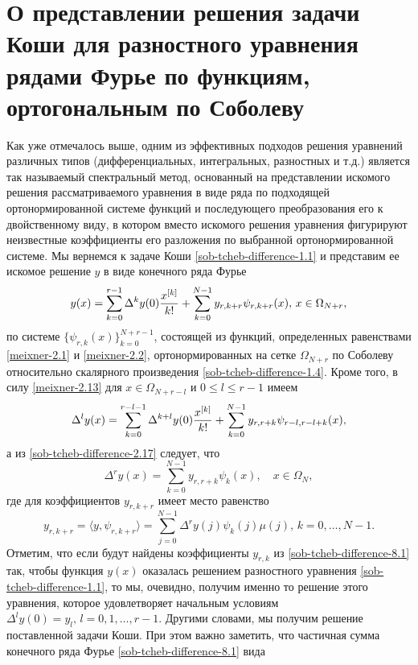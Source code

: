 \section{О представлении решения задачи Коши для разностного уравнения рядами Фурье по функциям, ортогональным по Соболеву}

Как уже отмечалось выше, одним из эффективных подходов решения уравнений различных типов
(дифференциальных, интегральных, разностных и т.д.) является \cite{sob-tcheb-difference-SolDmEg, sob-tcheb-difference-Tref1, sob-tcheb-difference-Tref2} так называемый спектральный метод, основанный на представлении искомого решения рассматриваемого уравнения в виде ряда по подходящей ортонормированной системе функций  и последующего  преобразования его к двойственному виду, в котором вместо искомого решения уравнения фигурируют  неизвестные коэффициенты его разложения по выбранной ортонормированной системе. Мы вернемся к задаче Коши \eqref{sob-tcheb-difference-1.1} и представим ее искомое решение $y$ в виде конечного ряда Фурье
\begin{equation}\label{sob-tcheb-difference-8.1}
 y(x)= \sum_{k=0}^{r-1}\Delta^ky(0){x^{[k]}\over k!} +\sum_{k=0}^{N-1}y_{r,k+r} \psi_{r,k+r}(x),\, x\in \Omega_{N+r},
  \end{equation}
по системе  $\{\psi_{r,k}(x)\}_{k=0}^{N+r-1}$, состоящей из функций, определенных равенствами   \eqref{meixner-2.1} и \eqref{meixner-2.2}, ортонормированных на сетке $\Omega_{N+r}$ по Соболеву относительно скалярного произведения \eqref{sob-tcheb-difference-1.4}. Кроме того, в силу \eqref{meixner-2.13} для $x\in \Omega_{N+r-l} $ и  $0\le l\le r-1$ имеем
\begin{equation}\label{sob-tcheb-difference-8.2}
 \Delta^l y(x)= \sum_{k=0}^{r-l-1}\Delta^{k+l}y(0){x^{[k]}\over k!} +\sum_{k=0}^{N-1} y_{r,r+k} \psi_{r-l,r-l+k}(x),
  \end{equation}
а из \eqref{sob-tcheb-difference-2.17} следует, что
 \begin{equation}\label{sob-tcheb-difference-8.3}
 \Delta^r y(x)= \sum_{k=0}^{N-1} y_{r,r+k} \psi_{k}(x), \quad x\in \Omega_{N},
  \end{equation}
где для коэффициентов $y_{r,k+r}$ имеет место равенство
\begin{equation}\label{sob-tcheb-difference-8.4}
y_{r,k+r}= \langle y,\psi_{r,k+r} \rangle =
\sum_{j=0}^{N-1}\Delta^ry(j)\psi_{k}(j)\mu(j),\, k=0,\ldots, N-1.
\end{equation}
Отметим, что если будут найдены коэффициенты $y_{r,k}$ из  \eqref{sob-tcheb-difference-8.1}  так, чтобы функция $y(x)$ оказалась решением разностного уравнения \eqref{sob-tcheb-difference-1.1}, то мы, очевидно, получим именно то решение этого уравнения, которое удовлетворяет начальным условиям $\Delta^{l}y(0)=y_l, \, l=0,1,\ldots,r-1$. Другими словами, мы получим решение поставленной задачи Коши. При этом важно заметить, что частичная сумма конечного ряда   Фурье \eqref{sob-tcheb-difference-8.1} вида

